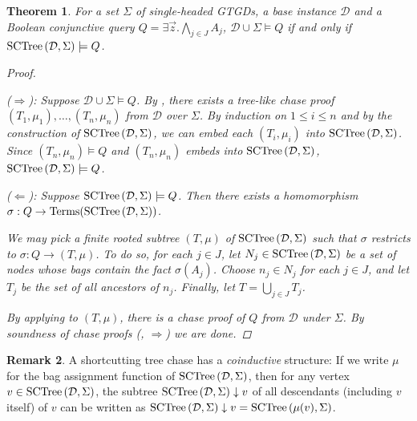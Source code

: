 \documentclass[12pt]{report}
\theoremstyle{plain}
\newtheorem{theorem}{Theorem}[chapter]
\theoremstyle{definition}
\newtheorem{remark}[theorem]{Remark}
\def\Terms{{\mathrm{Terms}}}
\newcommand{\SCTree}[2]{\ensuremath{\normalfont{\textrm{SCTree}} \left( #1, #2 \right)}}
\begin{document}
\begin{theorem}
\label{sctree-soundness-completeness}
  For a set $\Sigma$ of single-headed GTGDs, a base instance $\mathcal{D}$ and a Boolean conjunctive query $Q = \exists \vec{z}. \bigwedge_{j \in J} A_j$, $\mathcal{D} \cup \Sigma \models Q$ if and only if $\SCTree{\mathcal{D}}{\Sigma} \models Q$.
  \begin{proof}[Proof] $ $\par
    ($\Longrightarrow$): Suppose $\mathcal{D} \cup \Sigma \models Q$. By , there exists a tree-like chase proof $(T_1, \mu_1), \ldots, (T_n, \mu_n)$ from $\mathcal{D}$ over $\Sigma$. By induction on $1 \leq i \leq n$ and by the construction of $\SCTree{\mathcal{D}}{\Sigma}$, we can embed each $(T_i, \mu_i)$ into $\SCTree{\mathcal{D}}{\Sigma}$. Since $(T_n, \mu_n) \models Q$ and $(T_n, \mu_n)$ embeds into $\SCTree{\mathcal{D}}{\Sigma}$, $\SCTree{\mathcal{D}}{\Sigma} \models Q$.

    ($\Longleftarrow$): Suppose $\SCTree{\mathcal{D}}{\Sigma} \models Q$. Then there exists a homomorphism $\sigma:\nobreak Q \rightarrow \Terms(\SCTree{\mathcal{D}}{\Sigma})$.
    
    We may pick a finite rooted subtree $(T, \mu)$ of $\SCTree{\mathcal{D}}{\Sigma}$ such that $\sigma$ restricts to $\sigma: Q \rightarrow (T, \mu)$. To do so, for each $j \in J$, let $N_j \in \SCTree{\mathcal{D}}{\Sigma}$ be a set of nodes whose bags contain the fact $\sigma(A_j)$. Choose $n_j \in N_j$ for each $j \in J$, and let $T_j$ be the set of all ancestors of $n_j$. Finally, let $T = \bigcup_{j \in J} T_j$.

    By applying  to $(T, \mu)$, there is a chase proof of $Q$ from $\mathcal{D}$ under $\Sigma$. By soundness of chase proofs (, $\Longrightarrow$) we are done.
  \end{proof}
\end{theorem}

\begin{remark}
\label{coinductiveness-of-sctree}
  A shortcutting tree chase has a \emph{coinductive} structure: If we write $\mu$ for the bag assignment function of $\SCTree{\mathcal{D}}{\Sigma}$, then for any vertex $v \in \SCTree{\mathcal{D}}{\Sigma}$, the subtree $\SCTree{\mathcal{D}}{\Sigma} \downarrow v$ of all descendants (including $v$ itself) of $v$ can be written as $\SCTree{\mathcal{D}}{\Sigma} \downarrow v = \SCTree{\mu(v)}{\Sigma}$.
\end{remark}
\end{document}
